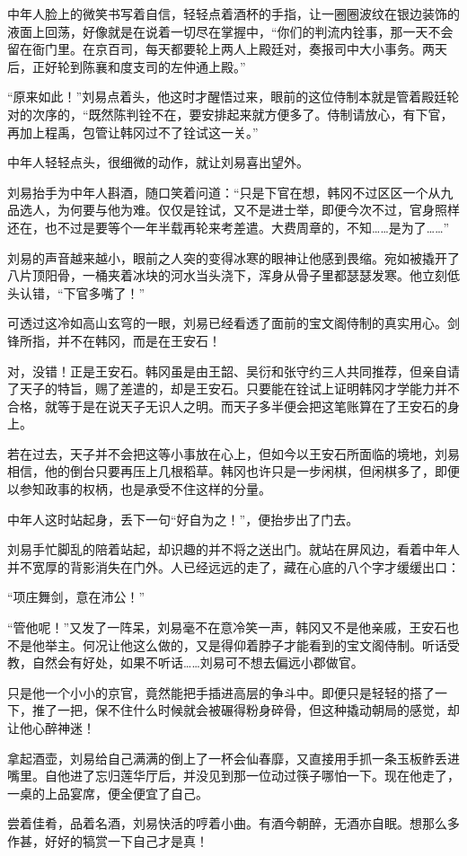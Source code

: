 中年人脸上的微笑书写着自信，轻轻点着酒杯的手指，让一圈圈波纹在银边装饰的液面上回荡，好像就是在说着一切尽在掌握中，“你们的判流内铨事，那一天不会留在衙门里。在京百司，每天都要轮上两人上殿廷对，奏报司中大小事务。两天后，正好轮到陈襄和度支司的左仲通上殿。”

“原来如此！”刘易点着头，他这时才醒悟过来，眼前的这位侍制本就是管着殿廷轮对的次序的，“既然陈判铨不在，要安排起来就方便多了。侍制请放心，有下官，再加上程禹，包管让韩冈过不了铨试这一关。”

中年人轻轻点头，很细微的动作，就让刘易喜出望外。

刘易抬手为中年人斟酒，随口笑着问道：“只是下官在想，韩冈不过区区一个从九品选人，为何要与他为难。仅仅是铨试，又不是进士举，即便今次不过，官身照样还在，也不过是要等个一年半载再轮来考差遣。大费周章的，不知……是为了……”

刘易的声音越来越小，眼前之人突的变得冰寒的眼神让他感到畏缩。宛如被撬开了八片顶阳骨，一桶夹着冰块的河水当头浇下，浑身从骨子里都瑟瑟发寒。他立刻低头认错，“下官多嘴了！”

可透过这冷如高山玄穹的一眼，刘易已经看透了面前的宝文阁侍制的真实用心。剑锋所指，并不在韩冈，而是在王安石！

对，没错！正是王安石。韩冈虽是由王韶、吴衍和张守约三人共同推荐，但亲自请了天子的特旨，赐了差遣的，却是王安石。只要能在铨试上证明韩冈才学能力并不合格，就等于是在说天子无识人之明。而天子多半便会把这笔账算在了王安石的身上。

若在过去，天子并不会把这等小事放在心上，但如今以王安石所面临的境地，刘易相信，他的倒台只要再压上几根稻草。韩冈也许只是一步闲棋，但闲棋多了，即便以参知政事的权柄，也是承受不住这样的分量。

中年人这时站起身，丢下一句“好自为之！”，便抬步出了门去。

刘易手忙脚乱的陪着站起，却识趣的并不将之送出门。就站在屏风边，看着中年人并不宽厚的背影消失在门外。人已经远远的走了，藏在心底的八个字才缓缓出口：

“项庄舞剑，意在沛公！”

“管他呢！”又发了一阵呆，刘易毫不在意冷笑一声，韩冈又不是他亲戚，王安石也不是他举主。何况让他这么做的，又是得仰着脖子才能看到的宝文阁侍制。听话受教，自然会有好处，如果不听话……刘易可不想去偏远小郡做官。

只是他一个小小的京官，竟然能把手插进高层的争斗中。即便只是轻轻的搭了一下，推了一把，保不住什么时候就会被碾得粉身碎骨，但这种撬动朝局的感觉，却让他心醉神迷！

拿起酒壶，刘易给自己满满的倒上了一杯会仙春靡，又直接用手抓一条玉板鲊丢进嘴里。自他进了忘归莲华厅后，并没见到那一位动过筷子哪怕一下。现在他走了，一桌的上品宴席，便全便宜了自己。

尝着佳肴，品着名酒，刘易快活的哼着小曲。有酒今朝醉，无酒亦自眠。想那么多作甚，好好的犒赏一下自己才是真！


